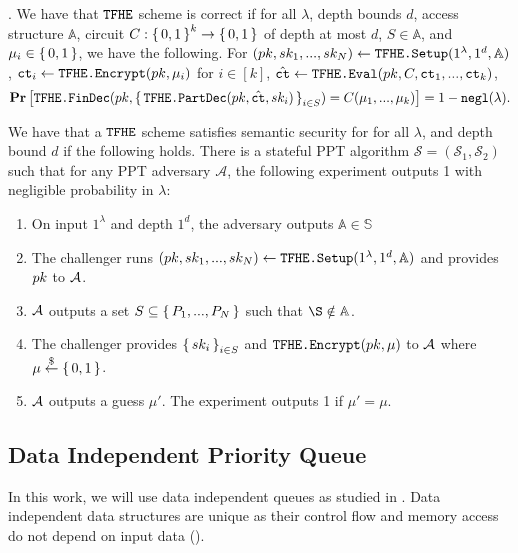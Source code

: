 \begin{definition}.
	We have that $\texttt{TFHE}$ scheme is correct if
	for all $\lambda$, depth bounds $d$, access structure $\mathbb{A}$, circuit $C : \set{0, 1}^k \rightarrow \set{0, 1}$
	of depth at most $d$, $S \in \mathbb{A}$, and $\mu_i \in \set{0, 1}$, we have the following.
	For $(pk, sk_1, ..., sk_N) \gets \texttt{TFHE.Setup}(1^\lambda, 1^d, \mathbb{A})$,
	$\texttt{ct}_i \gets \texttt{TFHE.Encrypt}(pk, \mu_i)$ for $i \in [k]$, $\hat{\texttt{ct}} \gets \texttt{TFHE.Eval}(pk, C, \texttt{ct}_1, ..., \texttt{ct}_k)$,
	\begin{equation*}
		\operatorname*{\mathbf{Pr}}\left[\texttt{TFHE.FinDec}(pk,
			\set{\texttt{TFHE.PartDec}(pk, \hat{\texttt{ct}}, sk_i)}_{i \in S}) = C(\mu_1, ..., \mu_k)\right] = 1 - \texttt{negl}(\lambda).
	\end{equation*}
\end{definition}

\begin{definition}
	We have that a $\texttt{TFHE}$ scheme satisfies semantic security for for all $\lambda$, and depth bound $d$ if the following holds. There is a stateful PPT algorithm
	$\mathcal{S} = (\mathcal{S}_1, \mathcal{S}_2)$ such that for any PPT adversary $\mathcal{A}$,
	the following experiment outputs 1 with negligible probability in $\lambda$:
	\begin{enumerate}
		\item On input $1^\lambda$ and depth $1^d$, the adversary outputs $\mathbb{A} \in \mathbb{S}$
		\item The challenger runs $(pk, sk_1, ..., sk_N) \gets \texttt{TFHE.Setup}(1^\lambda, 1^d, \mathbb{A})$ and provides $pk$ to $\mathcal{A}$.
		\item $\mathcal{A}$ outputs a set $S \subseteq \set{P_1, ..., P_N}$ such that $\S \notin \mathbb{A}$.
		\item The challenger provides $\set{sk_i}_{i \in S}$ and $\texttt{TFHE.Encrypt}(pk, \mu)$ to $\mathcal{A}$ where $\mu \overset{\$}{\gets} \set{0, 1}$.
		\item $\mathcal{A}$ outputs a guess $\mu'$. The experiment outputs 1 if $\mu' = \mu$.
	\end{enumerate}

\end{definition}

\subsection{Data Independent Priority Queue}
In this work, we will use data independent queues as studied in \cite{toft2011secure, mitchell2014data, mazloom2023efficient}.
Data independent data structures are unique as their control flow and memory access do not depend on input data (\cite{mitchell2014data}).


